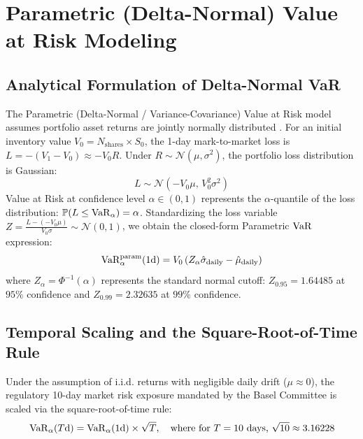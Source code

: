 
\section{Parametric (Delta-Normal) Value at Risk Modeling}
\label{sec:parametric_var}

\subsection{Analytical Formulation of Delta-Normal VaR}

The Parametric (Delta-Normal / Variance-Covariance) Value at Risk model assumes portfolio asset returns are jointly normally distributed \citep{jorion2006value}. For an initial inventory value $V_0 = N_{\text{shares}} \times S_0$, the 1-day mark-to-market loss is $L = -(V_1 - V_0) \approx -V_0 R$. Under $R \sim \mathcal{N}(\mu, \sigma^2)$, the portfolio loss distribution is Gaussian:
\begin{equation}
    L \sim \mathcal{N}\left( -V_0 \mu, \, V_0^2 \sigma^2 \right)
    \label{eq:loss_dist}
\end{equation}
Value at Risk at confidence level $\alpha \in (0, 1)$ represents the $\alpha$-quantile of the loss distribution: $\mathbb{P}(L \le \operatorname{VaR}_{\alpha}) = \alpha$. Standardizing the loss variable $Z = \frac{L - (-V_0 \mu)}{V_0 \sigma} \sim \mathcal{N}(0, 1)$, we obtain the closed-form Parametric $\operatorname{VaR}$ expression:
\begin{equation}
    \operatorname{VaR}_{\alpha}^{\text{param}}(1\text{d}) = V_0 \left( Z_{\alpha} \hat{\sigma}_{\text{daily}} - \hat{\mu}_{\text{daily}} \right)
    \label{eq:parametric_var_1d}
\end{equation}
where $Z_\alpha = \Phi^{-1}(\alpha)$ represents the standard normal cutoff: $Z_{0.95} = 1.64485$ at $95\%$ confidence and $Z_{0.99} = 2.32635$ at $99\%$ confidence.

\subsection{Temporal Scaling and the Square-Root-of-Time Rule}

Under the assumption of i.i.d. returns with negligible daily drift ($\mu \approx 0$), the regulatory 10-day market risk exposure mandated by the Basel Committee is scaled via the square-root-of-time rule:
\begin{equation}
    \operatorname{VaR}_{\alpha}(T\text{d}) = \operatorname{VaR}_{\alpha}(1\text{d}) \times \sqrt{T}, \quad \text{where for } T = 10 \text{ days, } \sqrt{10} \approx 3.16228
    \label{eq:sqrt_time_rule}
\end{equation}

